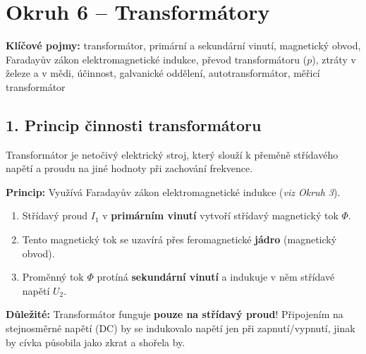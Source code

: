 \documentclass[a4paper,10pt]{article}
\begin{document}
\section*{\large Okruh 6 – Transformátory}

\begin{pojmybox}
\textbf{Klíčové pojmy:}
transformátor, primární a sekundární vinutí, magnetický obvod, Faradayův zákon elektromagnetické indukce, převod transformátoru ($p$), ztráty v železe a v mědi, účinnost, galvanické oddělení, autotransformátor, měřicí transformátor
\end{pojmybox}

\begin{vysvetlenibox}

\subsection*{1. Princip činnosti transformátoru}

Transformátor je netočivý elektrický stroj, který slouží k přeměně střídavého napětí a proudu na jiné hodnoty při zachování frekvence. 

\textbf{Princip:} Využívá Faradayův zákon elektromagnetické indukce (\textit{viz Okruh 3}).
\begin{enumerate}
  \item Střídavý proud $I_1$ v \textbf{primárním vinutí} vytvoří střídavý magnetický tok $\Phi$.
  \item Tento magnetický tok se uzavírá přes feromagnetické \textbf{jádro} (magnetický obvod).
  \item Proměnný tok $\Phi$ protíná \textbf{sekundární vinutí} a indukuje v něm střídavé napětí $U_2$.
\end{enumerate}

\begin{durazbox}
\textbf{Důležité:} Transformátor funguje \textbf{pouze na střídavý proud}! Připojením na stejnosměrné napětí (DC) by se indukovalo napětí jen při zapnutí/vypnutí, jinak by cívka působila jako zkrat a shořela by.
\end{durazbox}

\begin{center}
\end{center}
\end{vysvetlenibox}
\end{document}
